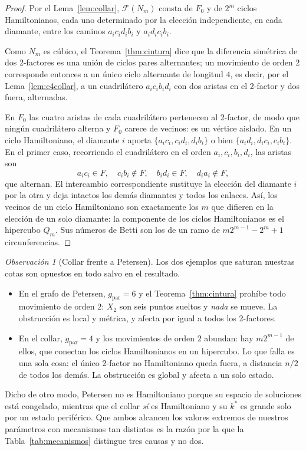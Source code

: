 \documentclass[11pt,a4paper]{article}
\theoremstyle{definition}
\theoremstyle{remark}
\newtheorem{observacion}[teorema]{Observación}
\begin{document}
\begin{proof}
Por el Lema~\ref{lem:collar}, $\mathcal{F}(N_m)$ consta de $F_0$ y de $2^m$ ciclos Hamiltonianos, cada uno determinado por la elección independiente, en cada diamante, entre los caminos $a_ic_id_ib_i$ y $a_id_ic_ib_i$.

Como $N_m$ es cúbico, el Teorema~\ref{thm:cintura} dice que la diferencia simétrica de dos 2-factores es una unión de ciclos pares alternantes; un movimiento de orden $2$ corresponde entonces a un único ciclo alternante de longitud $4$, es decir, por el Lema~\ref{lem:c4collar}, a un cuadrilátero $a_ic_ib_id_i$ con dos aristas en el 2-factor y dos fuera, alternadas.

En $F_0$ las cuatro aristas de cada cuadrilátero pertenecen al 2-factor, de modo que ningún cuadrilátero alterna y $F_0$ carece de vecinos: es un vértice aislado. En un ciclo Hamiltoniano, el diamante $i$ aporta $\{a_ic_i,c_id_i,d_ib_i\}$ o bien $\{a_id_i,d_ic_i,c_ib_i\}$. En el primer caso, recorriendo el cuadrilátero en el orden $a_i,c_i,b_i,d_i$, las aristas son
\[
a_ic_i\in F,\quad c_ib_i\notin F,\quad b_id_i\in F,\quad d_ia_i\notin F,
\]
que alternan. El intercambio correspondiente sustituye la elección del diamante $i$ por la otra y deja intactos los demás diamantes y todos los enlaces. Así, los vecinos de un ciclo Hamiltoniano son exactamente los $m$ que difieren en la elección de un solo diamante: la componente de los ciclos Hamiltonianos es el hipercubo $Q_m$. Sus números de Betti son los de un ramo de $m2^{m-1}-2^m+1$ circunferencias.
\end{proof}

\begin{observacion}[Collar frente a Petersen]\label{obs:collarpetersen}
Los dos ejemplos que saturan nuestras cotas son opuestos en todo salvo en el resultado.
\begin{itemize}
\item En el grafo de Petersen, $g_{\mathrm{par}}=6$ y el Teorema~\ref{thm:cintura} prohíbe todo movimiento de orden $2$: $X_2$ son seis puntos sueltos y \emph{nada} se mueve. La obstrucción es local y métrica, y afecta por igual a todos los 2-factores.
\item En el collar, $g_{\mathrm{par}}=4$ y los movimientos de orden $2$ abundan: hay $m2^{m-1}$ de ellos, que conectan los ciclos Hamiltonianos en un hipercubo. Lo que falla es una sola cosa: el único 2-factor no Hamiltoniano queda fuera, a distancia $n/2$ de todos los demás. La obstrucción es global y afecta a un solo estado.
\end{itemize}
Dicho de otro modo, Petersen no es Hamiltoniano porque su espacio de soluciones está congelado, mientras que el collar \emph{sí} es Hamiltoniano y su $k^*$ es grande solo por un estado periférico. Que ambos alcancen los valores extremos de nuestros parámetros con mecanismos tan distintos es la razón por la que la Tabla~\ref{tab:mecanismos} distingue tres causas y no dos.
\end{observacion}
\end{document}
